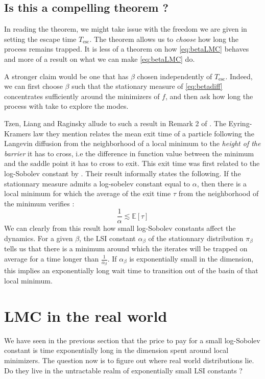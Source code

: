 \documentclass[10pt,journal,a4paper]{IEEEtran}
\theoremstyle{definition}
\newcommand{\E}{\mathbb{E}}
\begin{document}
\subsection{Is this a compelling theorem ?}

In reading the theorem, we might take issue with the freedom we are given in setting the escape time $T_{\text{esc}}$. The theorem allows us to \emph{choose} how long the process remains trapped. It is less of a theorem on how \eqref{eq:betaLMC} behaves and more of a result on what we can make \eqref{eq:betaLMC} do.

A stronger claim would be one that has $\beta$ chosen independently of $T_{\text{esc}}$. Indeed, we can first choose $\beta$ such that the stationary measure of \eqref{eq:betadiff} concentrates sufficiently around the minimizers of $f$, and then ask how long the process with take to explore the modes.

Tzen, Liang and Raginsky allude to such a result in Remark 2 of \cite{tzen_local_2018}. The Eyring-Kramers law they mention relates the mean exit time of a particle following the Langevin diffusion from the neighborhood of a local minimum to the \textit{height of the barrier} it has to cross, i.e the difference in function value between the minimum and the saddle point it has to cross to exit. This exit time was first related to the log-Sobolev constant by \cite{menz_poincare_2014-1}. Their result informally states the following. If the stationnary measure admits a log-sobelev constant equal to $\alpha$, then there is a local minimum for which the average of the exit time $\tau$ from the neighborhood of the minimum verifies :
\[
    \frac{1}{\alpha} \lesssim \E[\tau]
\]
We can clearly from this result how small log-Sobolev constants affect the dynamics. For a given $\beta$, the LSI constant $\alpha_\beta$ of the stationnary distribution $\pi_\beta$ tells us that there is a minimum around which the iterates will be trapped on average for a time longer than $\frac{1}{\alpha_\beta}$. If $\alpha_\beta$ is exponentially small in the dimension, this implies an exponentially long wait time to transition out of the basin of that local minimum.

\section{LMC in the real world}

We have seen in the previous section that the price to pay for a small log-Sobolev constant is time exponentially long in the dimension spent around local minimizers. The question now is to figure out where real world distributions lie. Do they live in the untractable realm of exponentially small LSI constants ?
\end{document}
